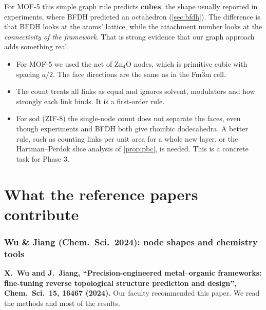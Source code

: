 \documentclass[11pt,a4paper]{article}
\theoremstyle{remark}\newtheorem*{example}{Worked example}
\begin{document}
\begin{keyidea}
For MOF-5 this simple graph rule predicts \textbf{cubes}, the shape usually reported in experiments, where BFDH predicted an octahedron (\autoref{sec:bfdh}). The difference is that BFDH looks at the atoms' lattice, while the attachment number looks at the \emph{connectivity of the framework}. That is strong evidence that our graph approach adds something real.
\end{keyidea}

\begin{careful}
\begin{itemize}
\item For MOF-5 we used the net of Zn$_4$O nodes, which is primitive cubic with spacing $a/2$. The face directions are the same as in the Fm$\bar3$m cell.
\item The count treats all links as equal and ignores solvent, modulators and how strongly each link binds. It is a first-order rule.
\item For sod (ZIF-8) the single-node count does not separate the faces, even though experiments and BFDH both give rhombic dodecahedra. A better rule, such as counting links per unit area for a whole new layer, or the Hartman--Perdok slice analysis of \autoref{prop:pbc}, is needed. This is a concrete task for Phase 3.
\end{itemize}
\end{careful}

\part{What the reference papers contribute}
\section{Wu \& Jiang (Chem.\ Sci.\ 2024): node shapes and chemistry tools}

\textbf{X.~Wu and J.~Jiang, ``Precision-engineered metal--organic frameworks: fine-tuning reverse topological structure prediction and design'', Chem.\ Sci.\ 15, 16467 (2024).} Our faculty recommended this paper. We read the methods and most of the results.
\end{document}
